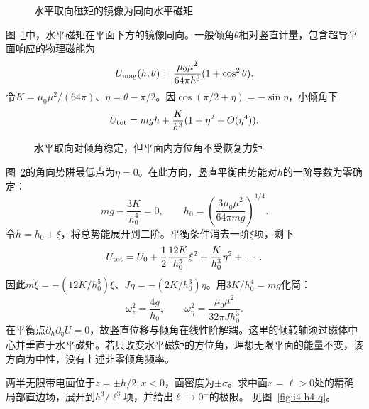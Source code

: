 \begin{figure}[H]\centering
{}
\caption{水平取向磁矩的镜像为同向水平磁矩}\label{fig:i4-h3-q}
\end{figure}
\begin{solution}
图~\ref{fig:i4-h3-q}中，水平磁矩在平面下方的镜像同向。一般倾角$\theta$相对竖直计量，包含超导平面响应的物理磁能为
\[
U_{\rm mag}(h,\theta)=
\frac{\mu_0\mu^2}{64\pi h^3}(1+\cos^2\theta).
\]
令$K=\mu_0\mu^2/(64\pi)$、$\eta=\theta-\pi/2$。因$\cos(\pi/2+\eta)=-\sin\eta$，小倾角下
\[
U_{\rm tot}=mgh+\frac K{h^3}(1+\eta^2+O(\eta^4)).
\]
\begin{figure}[H]\centering
{}
\caption{水平取向对倾角稳定，但平面内方位角不受恢复力矩}\label{fig:i4-h3-s}
\end{figure}
图~\ref{fig:i4-h3-s}的角向势阱最低点为$\eta=0$。在此方向，竖直平衡由势能对$h$的一阶导数为零确定：
\[
mg-\frac{3K}{h_0^4}=0,\qquad
\boxed{h_0=\left(\frac{3\mu_0\mu^2}{64\pi mg}\right)^{1/4}}.
\]
令$h=h_0+\xi$，将总势能展开到二阶。平衡条件消去一阶$\xi$项，剩下
\[
U_{\rm tot}=U_0+\frac12\frac{12K}{h_0^5}\xi^2
+\frac K{h_0^3}\eta^2+\cdots.
\]
因此$m\ddot\xi=-(12K/h_0^5)\xi$、$J\ddot\eta=-(2K/h_0^3)\eta$。用$3K/h_0^4=mg$化简：
\[
\boxed{\omega_z^2=\frac{4g}{h_0}},\qquad
\boxed{\omega_\eta^2=\frac{\mu_0\mu^2}{32\pi Jh_0^3}}.
\]
在平衡点$\partial_h\partial_\eta U=0$，故竖直位移与倾角在线性阶解耦。这里的倾转轴须过磁体中心并垂直于水平磁矩。若只改变水平磁矩的方位角，理想无限平面的能量不变，该方向为中性，没有上述非零倾角频率。
\end{solution}

\begin{exercise}[边缘场的间距修正]\label{ex:i4-h4}
两半无限带电面位于$z=\pm h/2,x<0$，面密度为$\pm\sigma$。求中面$x=\ell>0$处的精确局部直边场，展开到$h^3/\ell^3$项，并给出$\ell\to0^+$的极限。 见图~\ref{fig:i4-h4-q}。
\end{exercise}

